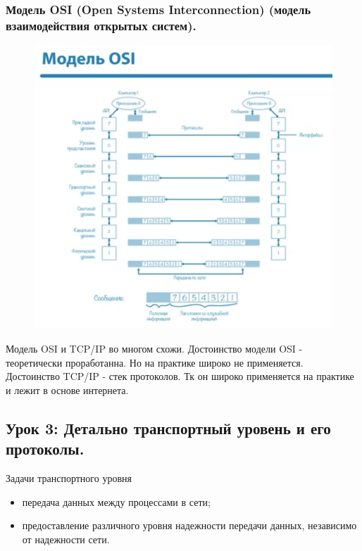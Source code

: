 \documentclass[a4paper,12pt]{article}
\begin{document}
	\subsubsection{Модель OSI (Open Systems Interconnection) (модель взаимодействия открытых систем).}
	
	\begin{figure}[h!]
		\begin{center}
			{\includegraphics[scale = 0.4]{4.png}}
			\label{4}
		\end{center}
	\end{figure}
	
	Модель OSI и TCP/IP во многом схожи. Достоинство модели OSI - теоретически проработанна. Но на практике широко не применяется.
	Достоинство TCP/IP - стек протоколов. Тк он широко применяется на практике и лежит в основе интернета.
	
	\subsection{Урок 3: Детально транспортный уровень и его протоколы.}
	
	Задачи транспортного уровня
	
	\begin{itemize}
		\item передача данных между процессами в сети;
		\item предоставление различного уровня надежности передачи данных, независимо от надежности сети.
	\end{itemize}
\end{document}
